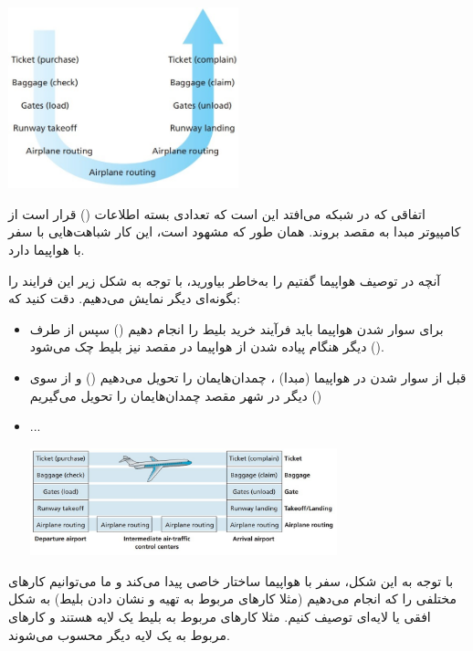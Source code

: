 \documentclass[]{article}
\begin{document}
\begin{center}
\includegraphics[width=0.5\textwidth]{images/1.jpg}
\end{center}

اتفاقی که در شبکه می‌افتد این است که تعدادی بسته اطلاعات () قرار است از کامپیوتر مبدا به مقصد بروند. همان طور که مشهود است، این کار شباهت‌هایی با سفر با هواپیما دارد.

 
آنچه در توصیف هواپیما گفتیم را به‌خاطر بیاورید، با توجه به شکل زیر این فرایند را بگونه‌ای دیگر نمایش می‌دهیم. دقت کنید که:


\begin{itemize}
\item
برای سوار شدن هواپیما باید فرآیند خرید بلیط را انجام دهیم () سپس از طرف دیگر هنگام پیاده شدن از هواپیما در مقصد نیز بلیط چک می‌شود (‌). 
\item
قبل از سوار شدن در هواپیما (مبدا) ، چمدان‌هایمان را تحویل می‌دهیم () و از سوی دیگر در شهر مقصد چمدان‌هایمان را تحویل می‌گیریم ()

\item
...

\begin{center}
\includegraphics[width=0.7\textwidth]{images/2.jpg}
\end{center}
\end{itemize}

با توجه به این شکل، سفر با هواپیما ساختار خاصی پیدا می‌کند و ما می‌توانیم کارهای مختلفی را که انجام می‌دهیم (مثلا کارهای مربوط به تهیه و نشان دادن بلیط‌) به شکل افقی یا لایه‌ای توصیف کنیم. مثلا کارهای مربوط به بلیط یک لایه هستند و کارهای مربوط به  یک لایه دیگر محسوب می‌شوند.
\end{document}
